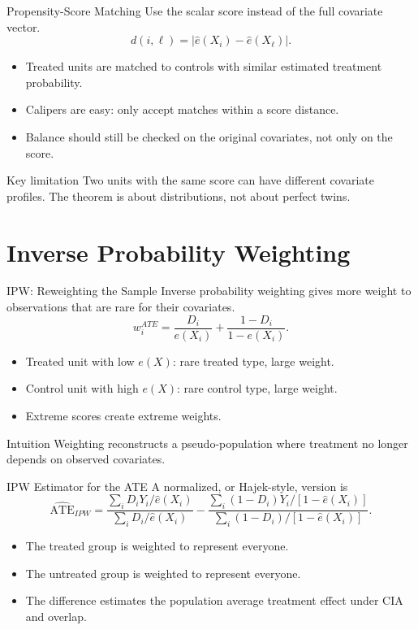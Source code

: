 \documentclass[11pt,aspectratio=169]{beamer}
\newcommand{\ATE}{\mathrm{ATE}}
\newcommand{\derivbutton}[1]{\vspace{0.4em}\hfill\hyperlink{app:#1}{\beamerbutton{Appendix details}}}
\begin{document}
\begin{frame}{Propensity-Score Matching}
  Use the scalar score instead of the full covariate vector.
  \[
    d(i,\ell)=|\widehat{e}(X_i)-\widehat{e}(X_\ell)|.
  \]
  \begin{itemize}
    \item Treated units are matched to controls with similar estimated treatment probability.
    \item Calipers are easy: only accept matches within a score distance.
    \item Balance should still be checked on the original covariates, not only on the score.
  \end{itemize}
  \begin{block}{Key limitation}
    Two units with the same score can have different covariate profiles. The theorem is about distributions, not about perfect twins.
  \end{block}
\end{frame}

\section{Inverse Probability Weighting}

\begin{frame}{IPW: Reweighting the Sample}
  \hypertarget{main:ipw}{}
  Inverse probability weighting gives more weight to observations that are rare for their covariates.
  \[
    w_i^{ATE}
    =
    \frac{D_i}{e(X_i)}
    +
    \frac{1-D_i}{1-e(X_i)}.
  \]
  \begin{itemize}
    \item Treated unit with low \(e(X)\): rare treated type, large weight.
    \item Control unit with high \(e(X)\): rare control type, large weight.
    \item Extreme scores create extreme weights.
  \end{itemize}
  \begin{block}{Intuition}
    Weighting reconstructs a pseudo-population where treatment no longer depends on observed covariates.
  \end{block}
  \derivbutton{ipw-proof}
\end{frame}

\begin{frame}{IPW Estimator for the ATE}
  A normalized, or Hajek-style, version is
  \[
    \widehat{\ATE}_{IPW}
    =
    \frac{\sum_i D_iY_i/\widehat{e}(X_i)}
         {\sum_i D_i/\widehat{e}(X_i)}
    -
    \frac{\sum_i (1-D_i)Y_i/[1-\widehat{e}(X_i)]}
         {\sum_i (1-D_i)/[1-\widehat{e}(X_i)]}.
  \]
  \begin{itemize}
    \item The treated group is weighted to represent everyone.
    \item The untreated group is weighted to represent everyone.
    \item The difference estimates the population average treatment effect under CIA and overlap.
  \end{itemize}
\end{frame}
\end{document}
